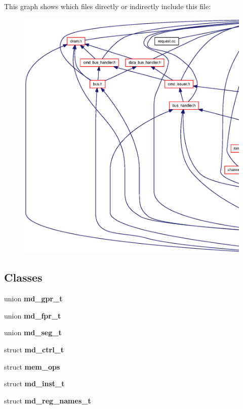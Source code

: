 This graph shows which files directly or indirectly include this file:\nopagebreak
\begin{figure}[H]
\begin{center}
\leavevmode
\includegraphics[width=420pt]{machine_8h__dep__incl}
\end{center}
\end{figure}
\subsection*{Classes}
\begin{CompactItemize}
\item 
union {\bf md\_\-gpr\_\-t}
\item 
union {\bf md\_\-fpr\_\-t}
\item 
union {\bf md\_\-seg\_\-t}
\item 
struct {\bf md\_\-ctrl\_\-t}
\item 
struct {\bf mem\_\-ops}
\item 
struct {\bf md\_\-inst\_\-t}
\item 
struct {\bf md\_\-reg\_\-names\_\-t}
\end{CompactItemize}
